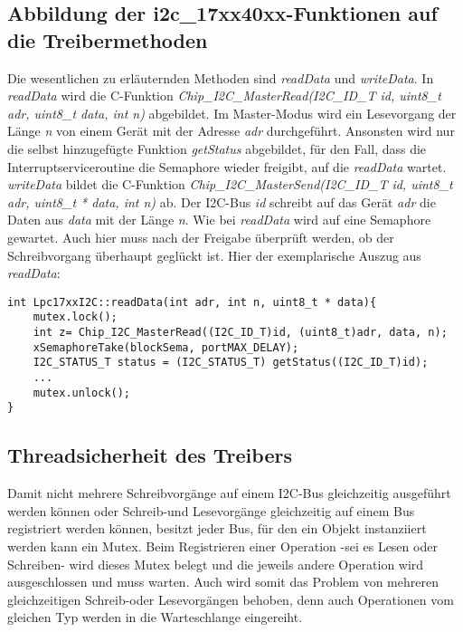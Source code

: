 \subsection{Abbildung der i2c\_17xx40xx-Funktionen auf die Treibermethoden}
Die wesentlichen zu erläuternden Methoden sind {\textit{readData}} und {\textit{writeData}}.
In {\textit{readData}} wird die C-Funktion {\textit{Chip\_I2C\_MasterRead(I2C\_ID\_T id, uint8\_t adr, uint8\_t data, int n)}} abgebildet. Im Master-Modus wird ein Lesevorgang der Länge {\textit{n}} von einem Gerät mit der Adresse {\textit{adr}} durchgeführt. Ansonsten wird nur die selbst hinzugefügte Funktion {\textit{getStatus}} abgebildet, für den Fall, dass die Interruptserviceroutine die Semaphore wieder freigibt, auf die {\textit{readData}} wartet.\\
{\textit{writeData}} bildet die C-Funktion {\textit{Chip\_I2C\_MasterSend(I2C\_ID\_T id, uint8\_t adr, uint8\_t * data, int n)}} ab. Der I2C-Bus {\textit{id}} schreibt auf das Gerät {\textit{adr}} die Daten aus {\textit{data}} mit der Länge {\textit{n}}. Wie bei {\textit{readData}} wird auf eine Semaphore gewartet. Auch hier muss nach der Freigabe überprüft werden, ob der Schreibvorgang überhaupt geglückt ist. Hier der exemplarische Auszug aus {\textit{readData}}:
\begin{lstlisting}
int Lpc17xxI2C::readData(int adr, int n, uint8_t * data){
	mutex.lock();
	int z= Chip_I2C_MasterRead((I2C_ID_T)id, (uint8_t)adr, data, n);
	xSemaphoreTake(blockSema, portMAX_DELAY);
	I2C_STATUS_T status = (I2C_STATUS_T) getStatus((I2C_ID_T)id);
	...	
	mutex.unlock();
}
\end{lstlisting}

\subsection{Threadsicherheit des Treibers}
Damit nicht mehrere Schreibvorgänge auf einem I2C-Bus gleichzeitig ausgeführt werden können oder Schreib-und Lesevorgänge gleichzeitig auf einem Bus registriert werden können, besitzt jeder Bus, für den ein Objekt instanziiert werden kann ein Mutex. Beim Registrieren einer Operation -sei es Lesen oder Schreiben- wird dieses Mutex belegt und die jeweils andere Operation wird ausgeschlossen und muss warten. Auch wird somit das Problem von mehreren gleichzeitigen Schreib-oder Lesevorgängen behoben, denn auch Operationen vom gleichen Typ werden in die Warteschlange eingereiht.

